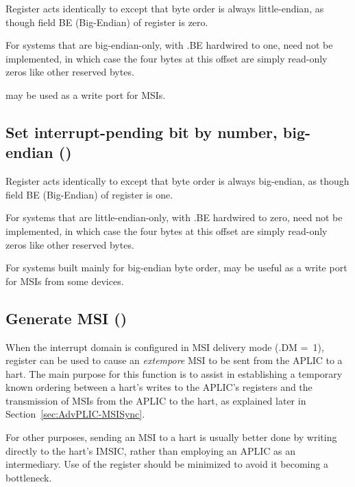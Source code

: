 Register  acts identically to  except that
byte order is always little-endian, as though field BE (Big-Endian) of
register  is zero.

For systems that are big-endian-only, with .BE hardwired
to one,  need not be implemented, in which case
the four bytes at this offset are simply read-only zeros like other
reserved bytes.

 may be used as a write port for MSIs.

\subsection{%
Set interrupt-pending bit by number, big-endian ()%
}

Register  acts identically to  except that
byte order is always big-endian, as though field BE (Big-Endian) of
register  is one.

For systems that are little-endian-only, with .BE
hardwired to zero,  need not be implemented, in which
case the four bytes at this offset are simply read-only zeros like
other reserved bytes.

For systems built mainly for big-endian byte order, 
may be useful as a write port for MSIs from some devices.

\subsection{Generate MSI ()}
\label{sec:AdvPLIC-reg-genmsi}

When the interrupt domain is configured in MSI delivery mode
(.DM =~1), register  can be used to cause an
\emph{extempore} MSI to be sent from the APLIC to a hart.
The main purpose for this function is to assist in establishing
a temporary known ordering between a hart's writes to the APLIC's
registers and the transmission of MSIs from the APLIC to the hart, as
explained later in Section~\ref{sec:AdvPLIC-MSISync}.

\begin{commentary}
For other purposes, sending an MSI to a hart is usually better done by
writing directly to the hart's IMSIC, rather than employing an APLIC as
an intermediary.
Use of the  register should be minimized to avoid it becoming
a bottleneck.
\end{commentary}

